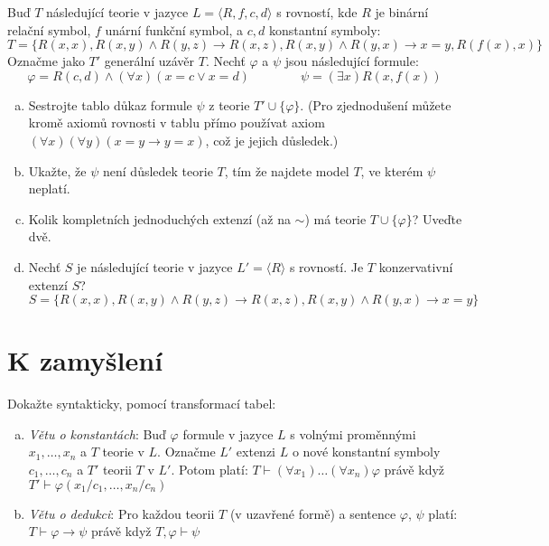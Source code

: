 \begin{problem} 

    Buď $T$ následující teorie v jazyce $L=\langle R,f,c,d\rangle$ s rovností, kde $R$ je binární relační symbol,  $f$ unární funkční symbol, a $c,d$ konstantní symboly:
    $$
    T=\{R(x,x),R(x,y)\wedge R(y,z)\to R(x,z),R(x,y)\wedge R(y,x)\to x=y,R(f(x),x)\}
    $$
    Označme jako $T'$ generální uzávěr $T$. Nechť $\varphi$ a $\psi$ jsou následující formule:
    $$
    \varphi = R(c,d) \wedge (\forall x)(x=c\vee x=d)\qquad\qquad
    \psi = (\exists x)R(x,f(x))
    $$
    \begin{enumerate}[(a)]
        \item Sestrojte tablo důkaz formule $\psi$ z teorie $T'\cup\{\varphi\}$. (Pro zjednodušení můžete kromě axiomů rovnosti v tablu přímo používat axiom $(\forall x)(\forall y)(x=y\to y=x)$, což je jejich důsledek.)
        \item Ukažte, že $\psi$ není důsledek teorie $T$, tím že najdete model $T$, ve kterém $\psi$ neplatí.
        \item Kolik kompletních jednoduchých extenzí (až na $\sim$) má teorie $T\cup \{\varphi\}$? Uveďte dvě.
        \item Nechť $S$ je následující teorie v jazyce $L'=\langle R\rangle$ s rovností. Je $T$ konzervativní extenzí $S$?
        $$S=\{R(x,x),R(x,y)\wedge R(y,z)\to R(x,z),R(x,y)\wedge R(y,x)\to x=y\}$$     
    \end{enumerate}

\end{problem}


\section*{K zamyšlení}


\begin{problem} 
    
    Dokažte syntakticky, pomocí transformací tabel:
    \begin{enumerate}[(a)]
        \item \emph{Větu o konstantách}: Buď $\varphi$ formule v jazyce $L$ s volnými proměnnými $x_1,\dots,x_n$ a $T$ teorie v $L$. Označme $L'$ extenzi $L$ o nové konstantní symboly $c_1,\dots,c_n$ a $T'$ teorii $T$ v $L'$. Potom platí:
        $T \vdash (\forall x_1)\dots(\forall x_n)\varphi$ právě když $T'\vdash\varphi(x_1/c_1,\dots,x_n/c_n)$
        \item \emph{Větu o dedukci}: Pro každou teorii $T$ (v uzavřené formě) a sentence $\varphi$, $\psi$ platí: $T\vdash \varphi\to\psi$ právě když $T,\varphi\vdash\psi$
    \end{enumerate}

\end{problem}


